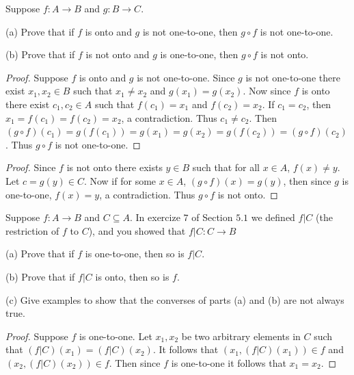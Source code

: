 \newpage
\begin{tcolorbox}[title=Problem 11, breakable]
    Suppose $f : A \rightarrow B$ and $g : B \rightarrow C$.

    (a) Prove that if $f$ is onto and $g$ is not one-to-one,
        then $g \circ f$ is not one-to-one.

    (b) Prove that if $f$ is not onto and $g$ is one-to-one, 
        then $g \circ f$ is not onto.
\end{tcolorbox}

\begin{proof}
    Suppose $f$ is onto and $g$ is not one-to-one.
    Since $g$ is not one-to-one there exist 
        $x_1, x_2 \in B$ such that $x_1 \ne x_2$ and $g(x_1) = g(x_2)$.
    Now since $f$ is onto there exist $c_1, c_2 \in A$
        such that $f(c_1) = x_1$ and $f(c_2) = x_2$.
    If $c_1 = c_2$, then $x_1 = f(c_1) = f(c_2) = x_2$, a contradiction.
    Thus $c_1 \ne c_2$.
    Then $(g \circ f)(c_1) = g(f(c_1)) = g(x_1) = g(x_2) = g(f(c_2)) = (g \circ f)(c_2)$.
    Thus $g \circ f$ is not one-to-one.
\end{proof}

\begin{proof}
    Since $f$ is not onto there exists $y \in B$
        such that for all $x \in A$, $f(x) \ne y$.
    Let $c = g(y) \in C$.
    Now if for some $x \in A$, $(g \circ f)(x) = g(y)$,
        then since $g$ is one-to-one, $f(x) = y$, a contradiction.
    Thus $g \circ f$ is not onto.
\end{proof}


\begin{tcolorbox}[title=Problem 13, breakable]
    Suppose $f : A \rightarrow B$ and $C \subseteq A$.
    In exercize $7$ of Section $5.1$ we defined 
        $f | C$ (the restriction of $f$ to $C$),
        and you showed that $f | C : C \rightarrow B$

    (a) Prove that if $f$ is one-to-one, then so is $f | C$.

    (b) Prove that if $f | C$ is onto, then so is $f$.

    (c) Give examples to show that the converses of parts (a)
        and (b) are not always true.
\end{tcolorbox}

\begin{proof}
    Suppose $f$ is one-to-one.
    Let $x_1, x_2$ be two arbitrary elements in $C$ such that $(f | C)(x_1) = (f | C)(x_2)$.
    It follows that $(x_1, (f | C)(x_1)) \in f$ and $(x_2, (f | C)(x_2)) \in f$.
    Then since $f$ is one-to-one it follows that $x_1 = x_2$.
\end{proof}

